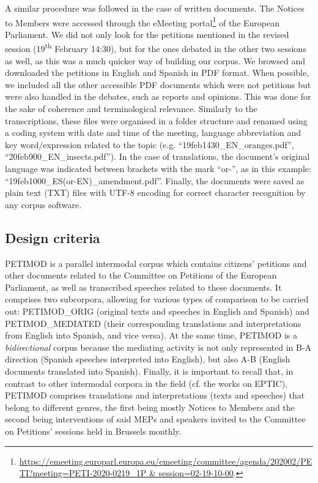 \documentclass[output=paper]{langscibook}
\begin{document}
A similar procedure was followed in the case of written documents.  The Notices to Members were accessed through the eMeeting portal\footnote{\url{https://emeeting.europarl.europa.eu/emeeting/committee/agenda/202002/PETI?meeting=PETI-2020-0219_1P & session=02-19-10-00}.}  of the European Parliament. We did not only look for the petitions mentioned in the revised session (19\textsuperscript{th} February 14:30), but for the ones debated in the other two sessions as well, as this was a much quicker way of  building our corpus. We browsed and downloaded the petitions in English and Spanish in PDF format. When possible, we included all the other accessible PDF documents which were not petitions but were also handled in the debates, such as reports and opinions. This was done for the sake of coherence and terminological relevance. Similarly to the transcriptions, these files were organised in a folder structure and renamed using a coding system with date and time of the meeting, language abbreviation and key word/expression related to the topic (e.g. “19feb1430\_EN\_oranges.pdf”, “20feb900\_EN\_insects.pdf”). In the case of translations, the document’s original language was indicated between brackets with the mark “or-”, as in this example: “19feb1000\_ES(or-EN)\_amendment.pdf”. Finally, the documents were saved as plain text (TXT) files with UTF-8 encoding for correct character recognition by any corpus software.

\subsection{Design criteria}\label{sec:corpas:3.2}

PETIMOD is a parallel intermodal corpus which contains citizens’ petitions and other documents related to the Committee on Petitions of the European Parliament, as well as transcribed speeches related to these documents. It comprises two subcorpora, allowing for various types of comparison to be carried out: PETIMOD\_ORIG (original texts and speeches in English and Spanish) and PETIMOD\_MEDIATED (their corresponding translations and interpretations from English into Spanish, and vice versa). At the same time, PETIMOD is a \textit{bidirectional} corpus \citep{Olohan2004} because the mediating activity is not only represented in B-A direction (Spanish speeches interpreted into English), but also A-B  (English documents translated into Spanish). Finally, it is important to recall that, in contrast to other intermodal corpora in the field (cf. the works on EPTIC), PETIMOD comprises translations and interpretations (texts and speeches) that belong to different genres, the first being mostly Notices to Members and the second being interventions of said MEPs and speakers invited to the Committee on Petitions’ sessions held in Brussels monthly. 
\end{document}
